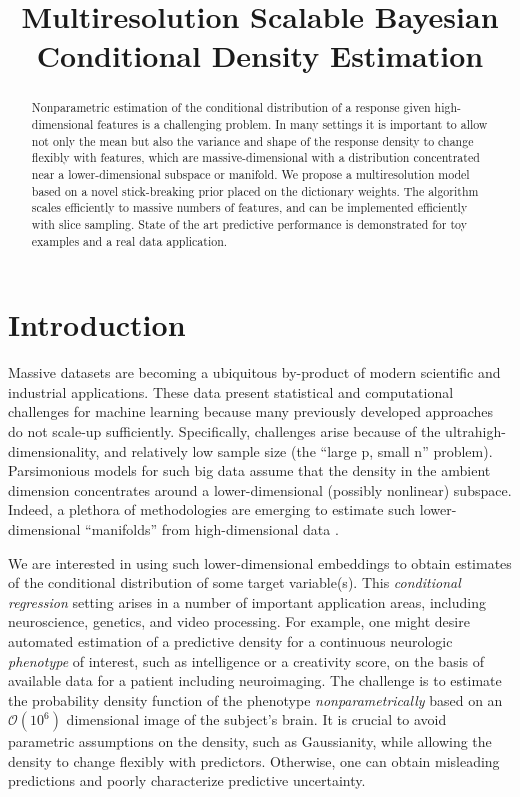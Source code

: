 \documentclass{article} %
\title{Multiresolution Scalable Bayesian Conditional Density Estimation}
\begin{document}
\renewcommand{\theenumi}{(\roman{enumi})}%


\maketitle

\begin{abstract}
Nonparametric estimation of the conditional distribution of a response given high-dimensional features is a challenging problem.  In many settings it is important to allow not only the mean but also the variance and shape of the response density to change flexibly with features, which are massive-dimensional with a distribution concentrated near a lower-dimensional subspace or manifold.  We propose a  multiresolution model based on a novel stick-breaking prior placed on the dictionary weights.  The algorithm scales efficiently to massive numbers of features, and can be implemented efficiently with slice sampling.  State of the art predictive performance is demonstrated for toy examples and a real data application.
\end{abstract}


\section{Introduction}


Massive datasets are becoming a ubiquitous by-product of modern scientific and industrial applications. These data present statistical and computational challenges for machine learning because many previously developed approaches do not scale-up sufficiently.  Specifically, challenges arise because of the ultrahigh-dimensionality, and relatively low sample size (the ``large p, small n'' problem).  Parsimonious models for such big data assume that the density in the ambient dimension concentrates around a lower-dimensional (possibly nonlinear) subspace.  Indeed, a plethora of methodologies are emerging to estimate such lower-dimensional ``manifolds'' from high-dimensional data \cite{Manifold, Maggioni}.  

We are interested in using such lower-dimensional embeddings to obtain estimates of the conditional distribution of some target variable(s).  This \emph{conditional regression} setting arises in a number of important application areas, including neuroscience, genetics, and video processing.  For example, one might desire automated estimation of a predictive density for a continuous neurologic {\em phenotype} of interest, such as intelligence or a creativity score, on the basis of available data for a patient including neuroimaging.  The challenge is to estimate the probability density function of the phenotype {\em nonparametrically} based on an $\mathcal{O}(10^6)$ dimensional image of the subject's brain.  It is crucial to avoid parametric assumptions on the density, such as Gaussianity, while allowing the density to change flexibly with predictors.  Otherwise, one can obtain misleading predictions and poorly characterize predictive uncertainty.
\end{document}
